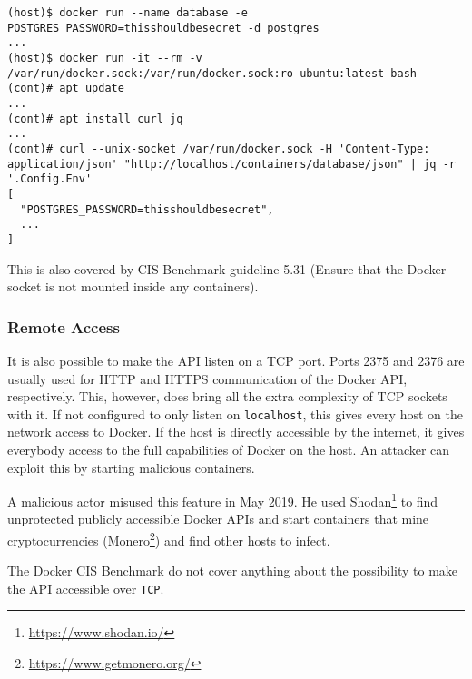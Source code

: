 \begin{lstlisting}[caption={Example extract secrets using the Docker API.},captionpos=b]
(host)$ docker run --name database -e POSTGRES_PASSWORD=thisshouldbesecret -d postgres
...
(host)$ docker run -it --rm -v /var/run/docker.sock:/var/run/docker.sock:ro ubuntu:latest bash
(cont)# apt update
...
(cont)# apt install curl jq
...
(cont)# curl --unix-socket /var/run/docker.sock -H 'Content-Type: application/json' "http://localhost/containers/database/json" | jq -r '.Config.Env'
[
  "POSTGRES_PASSWORD=thisshouldbesecret",
  ...
]
\end{lstlisting}

\hfill

This is also covered by CIS Benchmark guideline 5.31 (Ensure that the Docker socket is not mounted inside any containers).

\subsubsection{Remote Access}\label{subsubsection:remote-access}
It is also possible to make the API listen on a TCP port. Ports 2375 and 2376 are usually used for HTTP and HTTPS communication of the Docker API, respectively. This, however, does bring all the extra complexity of TCP sockets with it. If not configured to only listen on \lstinline{localhost}, this gives every host on the network access to Docker. If the host is directly accessible by the internet, it gives everybody access to the full capabilities of Docker on the host. An attacker can exploit this by starting malicious containers\cite{Metasploit-Unprotected-TCP-Socket}.

\hfill

A malicious actor misused this feature in May 2019. He used Shodan\footnote{\url{https://www.shodan.io/}} to find unprotected publicly accessible Docker APIs and start containers that mine cryptocurrencies (Monero\footnote{\url{https://www.getmonero.org/}}) and find other hosts to infect\cite{zoolu2-bot-1807}\cite{zoolu2-bot-1809}\cite{zoolu2-bot-1853}.

The Docker CIS Benchmark do not cover anything about the possibility to make the API accessible over \lstinline{TCP}.
